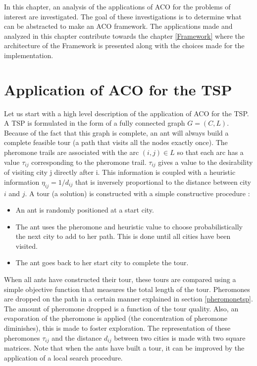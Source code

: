 In this chapter, an analysis of the applications of ACO for the problems of interest are investigated. The goal of these investigations is to determine what can be abstracted to make an ACO framework. The applications made and analyzed in this chapter contribute towards the chapter \ref{Framework} where the architecture of the Framework is presented along with the choices made for the implementation.

\section{Application of ACO for the TSP}\label{applitsp}
Let us start with a high level description of the application of ACO for the TSP. A TSP is formulated in the form of a fully connected graph $G=(C,L)$. Because of the fact that this graph is complete, an ant will always build a complete feasible tour (a path that visits all the nodes exactly once). The pheromone trails are associated with the arc $(i,j) \in L$ so that each arc has a value $\tau_{ij}$ corresponding to the pheromone trail. $\tau_{ij}$ gives a value to the desirability of visiting city j directly after i. This information is coupled with a heuristic information $\eta_{ij} = 1/d_{ij}$ that is inversely proportional to the distance between city $i$ and $j$.
A tour (a solution) is constructed with a simple constructive procedure :
\begin{itemize}
	\item An ant is randomly positioned at a start city.
	\item The ant uses the pheromone and heuristic value to choose probabilistically the next city to add to her path. This is done until all cities have been visited.
	\item The ant goes back to her start city to complete the tour.
\end{itemize}
When all ants have constructed their tour, these tours are compared using a simple objective function that measures the total length of the tour. Pheromones are dropped on the path in a certain manner explained in section \ref{pheromonetsp}. The amount of pheromone dropped is a function of the tour quality. Also, an evaporation of the pheromone is applied (the concentration of pheromone diminishes), this is made to foster exploration. The representation of these pheromones $\tau_{ij}$ and the distance $d_{ij}$ between two cities is made with two square matrices.
Note that when the ants have built a tour, it can be improved by the application of a local search procedure.

